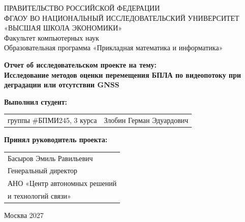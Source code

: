 \begin{titlepage}
\newpage

{
\begin{center}
ПРАВИТЕЛЬСТВО РОССИЙСКОЙ ФЕДЕРАЦИИ\\
ФГАОУ ВО НАЦИОНАЛЬНЫЙ ИССЛЕДОВАТЕЛЬСКИЙ УНИВЕРСИТЕТ\\
«ВЫСШАЯ ШКОЛА ЭКОНОМИКИ»
\\
\bigskip
Факультет компьютерных наук\\
Образовательная программа «Прикладная математика и информатика»
\end{center}
}

\vspace{10em}


\begin{center}
{\bf Отчет об исследовательском проекте на тему:}\\
{\bf Исследование методов оценки перемещения БПЛА по видеопотоку при деградации или отсутствии GNSS}\\
\end{center}

\vspace{2em}

{\bf Выполнил студент: \vspace{2mm}}

{
\begin{tabular}{l@{\hskip 1.5cm}l}
группы \#БПМИ245, 3 курса & Злобин Герман Эдуардович \\
\end{tabular}}


\vspace{1em}
{\bf Принял руководитель проекта: \vspace{2mm}}

{
\begin{tabular}{l}
Басыров Эмиль Равильевич\\
Генеральный директор\\
АНО «Центр автономных решений\\
и технологий связи»
\end{tabular}}


\vspace{\fill}

\begin{center}
Москва 2027
\end{center}

\end{titlepage}
